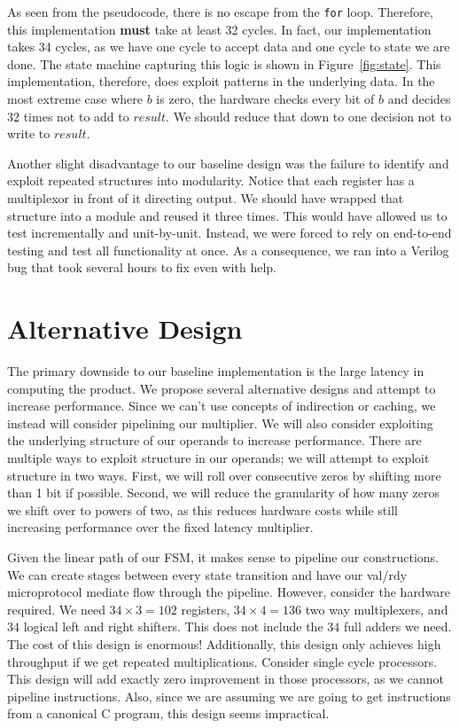 \documentclass[11pt]{article}
\begin{document}
As seen from the pseudocode, there is no escape from the \verb+for+ loop.
Therefore, this implementation \textbf{must} take at least 32 cycles.
In fact, our implementation takes 34 cycles, as we have one cycle to accept data and one cycle to state we are done.
The state machine capturing this logic is shown in Figure~\ref{fig:state}. 
This implementation, therefore, does exploit patterns in the underlying data.
In the most extreme case where $b$ is zero, the hardware checks every bit of $b$ and decides 32 times not to add to $result$.
We should reduce that down to one decision not to write to $result$.

Another slight disadvantage to our baseline design was the failure to identify and exploit repeated structures into modularity.
Notice that each register has a multiplexor in front of it directing output.
We should have wrapped that structure into a module and reused it three times. 
This would have allowed us to test incrementally and unit-by-unit.
Instead, we were forced to rely on end-to-end testing and test all functionality at once.
As a consequence, we ran into a Verilog bug that took several hours to fix even with help.  
 

\section{Alternative Design}

The primary downside to our baseline implementation is the large latency in computing the product.
We propose several alternative designs and attempt to increase performance.
Since we can't use concepts of indirection or caching, we instead will consider pipelining our multiplier.
We will also consider exploiting the underlying structure of our operands to increase performance.
There are multiple ways to exploit structure in our operands; we will attempt to exploit structure in two ways.
First, we will roll over consecutive zeros by shifting more than 1 bit if possible.
Second, we will reduce the granularity of how many zeros we shift over to powers of two, as this reduces hardware costs
while still increasing performance over the fixed latency multiplier.

Given the linear path of our FSM, it makes sense to pipeline our constructions.
We can create stages between every state transition and have our val/rdy microprotocol mediate flow through the pipeline.
However, consider the hardware required. We need $34 \times 3 = 102$ registers, $34 \times 4 = 136$ two way multiplexers,
and $34$ logical left and right shifters.
This does not include the $34$ full adders we need. 
The cost of this design is enormous!
Additionally, this design only achieves high throughput if we get repeated multiplications.
Consider single cycle processors.
This design will add exactly zero improvement in those processors, as we cannot pipeline instructions. 
Also, since we are assuming we are going to get instructions from a canonical C program, this design seems impractical.
\end{document}
